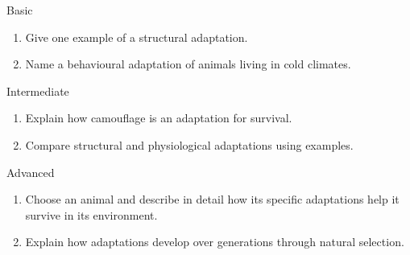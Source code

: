 \begin{tieredquestions}{Basic}
\begin{enumerate}
\item Give one example of a structural adaptation.
\item Name a behavioural adaptation of animals living in cold climates.
\end{enumerate}
\end{tieredquestions}

\begin{tieredquestions}{Intermediate}
\begin{enumerate}
\item Explain how camouflage is an adaptation for survival.
\item Compare structural and physiological adaptations using examples.
\end{enumerate}
\end{tieredquestions}

\begin{tieredquestions}{Advanced}
\begin{enumerate}
\item Choose an animal and describe in detail how its specific adaptations help it survive in its environment.
\item Explain how adaptations develop over generations through natural selection.
\end{enumerate}
\end{tieredquestions}

